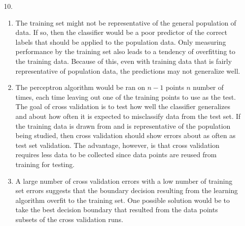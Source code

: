 \documentclass{article}
\begin{document}
\begin{enumerate}
\item[10.]
	\begin{enumerate}
	\item 
		  The training set might not be representative of the general population of data. If so, then the classifier would be a poor predictor of the correct labels that should be applied to the population data.
		  \newline\newline
		  Only measuring performance by the training set also leads to a tendency of overfitting to the training data. Because of this, even with training data that is fairly representative of population data, the predictions may not generalize well.
	\item 
		  The perceptron algorithm would be ran on $n-1$ points $n$ number of times, each time leaving out one of the training points to use as the test. The goal of cross validation is to test how well the classifier generalizes and about how often it is expected to misclassify data from the test set. If the training data is drawn from and is representative of the population being studied, then cross validation should show errors about as often as test set validation. The advantage, however, is that cross validation requires less data to be collected since data points are reused from training for testing. 
	\item 
		  A large number of cross validation errors with a low number of training set errors suggests that the boundary decision resulting from the learning algorithm overfit to the training set. One possible solution would be to take the best decision boundary that resulted from the data points subsets of the cross validation runs. 
	\end{enumerate}

\end{enumerate}
\end{document}
